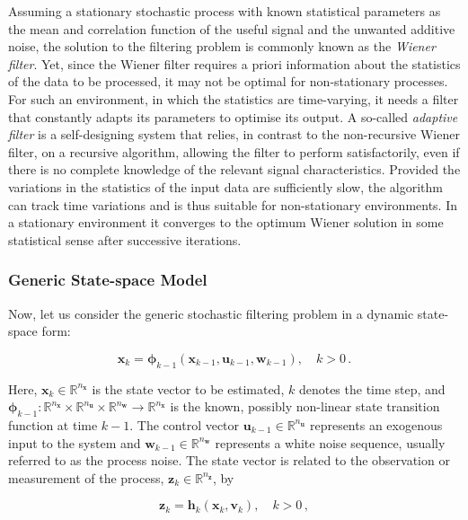 Assuming a stationary stochastic process with known statistical parameters as the mean and correlation function of the useful signal and the unwanted additive noise, the solution to the filtering problem is commonly known as the \emph{Wiener filter}. Yet, since the Wiener filter requires a priori information about the statistics of the data to be processed, it may not be optimal for non-stationary processes. For such an environment, in which the statistics are time-varying, it needs a filter that constantly adapts its parameters to optimise its output. A so-called \emph{adaptive filter} is a self-designing system that relies, in contrast to the non-recursive Wiener filter, on a recursive algorithm, allowing the filter to perform satisfactorily, even if there is no complete knowledge of the relevant signal characteristics. Provided the variations in the  statistics of the input data are sufficiently slow, the algorithm can track time variations and is thus suitable for non-stationary environments. In a stationary environment it converges to the optimum Wiener solution in some statistical sense after successive iterations.


\subsubsection{Generic State-space Model}

Now, let us consider the generic stochastic filtering problem in a dynamic state-space form:

\begin{equation}\label{eq:generic-state_dynamics}
  \bm{x}_k = \bm{\phi}_{k-1}(\bm{x}_{k-1}, \bm{u}_{k-1}, \bm{w}_{k-1}), \quad k > 0\,.
\end{equation}

\noindent
Here, $\bm{x}_k \in \mathbb{R}^{n_{\bm{x}}}$ is the state vector to be estimated, $k$ denotes the time step, and $\bm{\phi}_{k-1}: \mathbb{R}^{n_{\bm{x}}} \times \mathbb{R}^{n_{\bm{u}}} \times \mathbb{R}^{n_{\bm{w}}} \rightarrow \mathbb{R}^{n_{\bm{x}}}$ is the known, possibly non-linear state transition function at time $k-1$. The control vector $\bm{u}_{k-1} \in \mathbb{R}^{n_{\bm{u}}}$ represents an exogenous input to the system and $\bm{w}_{k-1} \in \mathbb{R}^{n_{\bm{w}}}$ represents a white noise sequence, usually referred to as the process noise. The state vector is related to the observation or measurement of the process, $\bm{z}_k \in \mathbb{R}^{n_{\bm{z}}}$, by

\begin{equation}\label{eq:generic-measurement}
  \bm{z}_k = \bm{h}_{k}(\bm{x}_{k}, \bm{v}_{k}), \quad k > 0\,,
\end{equation}

